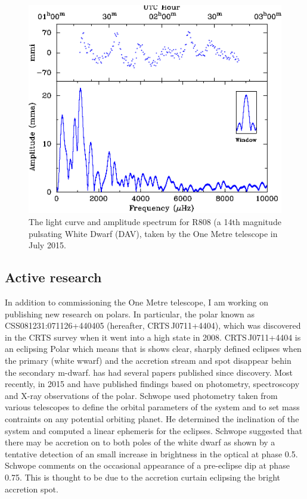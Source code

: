 \documentclass[a4paper,fleqn,usenatbib]{mnras}
\begin{document}
\begin{figure}
	\includegraphics[width=\columnwidth]{images/r808.pdf}
    \caption{The light curve and amplitude spectrum for R808 (a 14th magnitude pulsating White Dwarf (DAV), taken by the One Metre telescope in July 2015.}
    \label{fig:r808}
\end{figure}
 
\subsection{Active research}
In addition to commissioning the One Metre telescope, I am working on publishing new research on polars. In particular, the polar known as CSS081231:071126+440405 (hereafter,  CRTS\,J0711+4404), which was discovered in the CRTS survey when it went into a high state in 2008.  CRTS\,J0711+4404 is an eclipsing Polar which means that is shows clear, sharply defined eclipses when the primary (white wwarf) and the accretion stream and spot disappear behin the secondary m-dwarf. has had several papers published since discovery. Most recently, in 2015 \citet{Schwope2015} and \citet{Worpel2015} have published findings based on photometry, spectroscopy and X-ray observations of the polar. Schwope used photometry taken from various telescopes to define the orbital parameters of the system and to set mass contraints on any potential orbiting planet. He determined the inclination of the system and computed a linear ephemeris for the eclipses. Schwope suggested that there may be accretion on to both poles of the white dwarf as shown by a tentative detection of an small increase in brightness in the optical at phase 0.5. Schwope comments on the occasional appearance of a pre-eclipse dip at phase 0.75. This is thought to be due to the accretion curtain eclipsing the bright accretion spot.  
\end{document}
